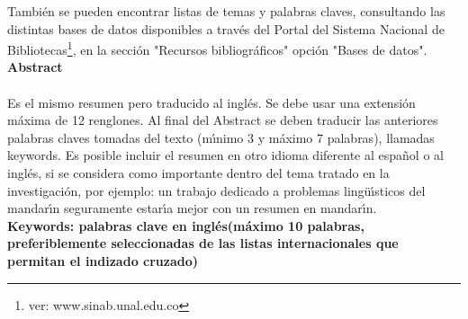 Tambi\'{e}n se pueden encontrar listas de temas y palabras claves, consultando las distintas bases de datos disponibles a trav\'{e}s del Portal del Sistema Nacional de Bibliotecas\footnote{ver: www.sinab.unal.edu.co}, en la secci\'{o}n "Recursos bibliogr\'{a}ficos" opci\'{o}n "Bases de datos".\\

\textbf{\LARGE Abstract}\\\\
Es el mismo resumen pero traducido al ingl\'{e}s. Se debe usar una extensi\'{o}n m\'{a}xima de 12 renglones. Al final del Abstract se deben traducir las anteriores palabras claves tomadas del texto (m\'{\i}nimo 3 y m\'{a}ximo 7 palabras), llamadas keywords. Es posible incluir el resumen en otro idioma diferente al espa\~{n}ol o al ingl\'{e}s, si se considera como importante dentro del tema tratado en la investigaci\'{o}n, por ejemplo: un trabajo dedicado a problemas ling\"{u}\'{\i}sticos del mandar\'{\i}n seguramente estar\'{\i}a mejor con un resumen en mandar\'{\i}n.\\[2.0cm]
\textbf{\small Keywords: palabras clave en ingl\'{e}s(m\'{a}ximo 10 palabras, preferiblemente seleccionadas de las listas internacionales que permitan el indizado cruzado)}\\
